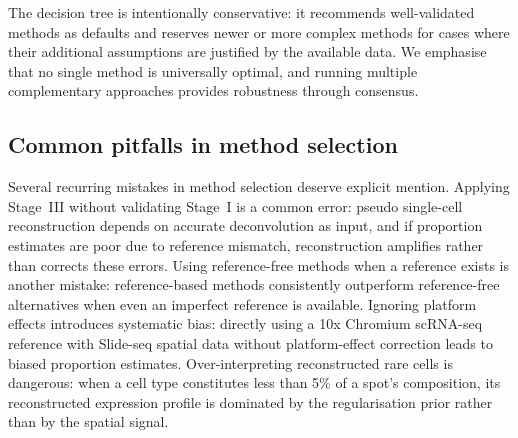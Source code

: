 The decision tree is intentionally conservative: it recommends well-validated methods as defaults and reserves newer or more complex methods for cases where their additional assumptions are justified by the available data. We emphasise that no single method is universally optimal, and running multiple complementary approaches provides robustness through consensus.

\subsection{Common pitfalls in method selection}

Several recurring mistakes in method selection deserve explicit mention. Applying Stage~III without validating Stage~I is a common error: pseudo single-cell reconstruction depends on accurate deconvolution as input, and if proportion estimates are poor due to reference mismatch, reconstruction amplifies rather than corrects these errors. Using reference-free methods when a reference exists is another mistake: reference-based methods consistently outperform reference-free alternatives when even an imperfect reference is available. Ignoring platform effects introduces systematic bias: directly using a 10x Chromium scRNA-seq reference with Slide-seq spatial data without platform-effect correction leads to biased proportion estimates. Over-interpreting reconstructed rare cells is dangerous: when a cell type constitutes less than 5\% of a spot's composition, its reconstructed expression profile is dominated by the regularisation prior rather than by the spatial signal.


